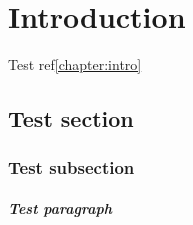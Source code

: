 \chapter{Introduction}
\label{chapter:intro}
\lipsum[2-10]
Test ref\autoref{chapter:intro}\cite{snafu}

\section{Test section}
\subsection{Test subsection}
\paragraph{Test paragraph}